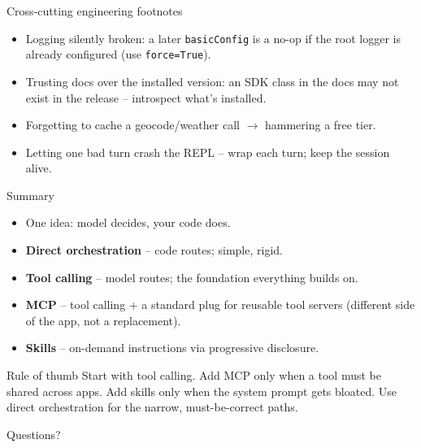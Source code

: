 \documentclass[aspectratio=169,10pt]{beamer}
\begin{document}
\begin{frame}{Cross-cutting engineering footnotes}
  \begin{itemize}
    \item \alert{Logging silently broken:} a later \texttt{basicConfig} is a no-op if the root logger is already configured (use \texttt{force=True}).
    \item \alert{Trusting docs over the installed version:} an SDK class in the docs may not exist in the release -- introspect what's installed.
    \item \alert{Forgetting to cache} a geocode/weather call $\rightarrow$ hammering a free tier.
    \item \alert{Letting one bad turn crash the REPL} -- wrap each turn; keep the session alive.
  \end{itemize}
\end{frame}

\begin{frame}{Summary}
  \begin{itemize}
    \item One idea: \alert{model decides, your code does}.
    \item \textbf{Direct orchestration} -- code routes; simple, rigid.
    \item \textbf{Tool calling} -- model routes; the foundation everything builds on.
    \item \textbf{MCP} -- tool calling + a standard plug for \alert{reusable} tool servers (different side of the app, not a replacement).
    \item \textbf{Skills} -- on-demand \alert{instructions} via progressive disclosure.
  \end{itemize}
  \vfill
  \begin{block}{Rule of thumb}
    \footnotesize Start with tool calling. Add MCP only when a tool must be shared across apps.
    Add skills only when the system prompt gets bloated. Use direct orchestration for the
    narrow, must-be-correct paths.
  \end{block}
  \vfill
  \centering \alert{Questions?}
\end{frame}
\end{document}
